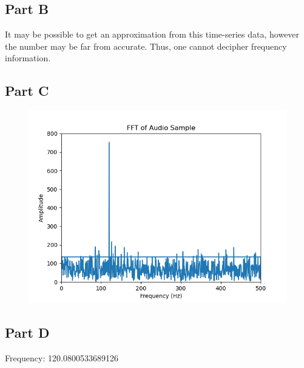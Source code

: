 \documentclass[]{report}
\begin{document}
\subsection{Part B}

\begin{center}
	It may be possible to get an approximation from this time-series data, however the number may be far from accurate. Thus, one cannot decipher frequency information.
\end{center}

\subsection{Part C}

\begin{figure}[H]
	\centering
	\includegraphics[width=0.7\linewidth]{../results/p3_fft}
\end{figure}


\subsection{Part D}

\begin{center}
	Frequency: 120.0800533689126
\end{center}
\end{document}
